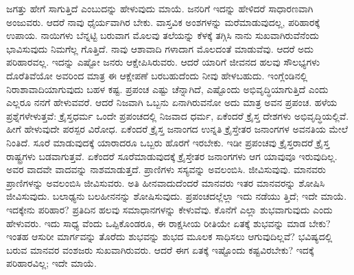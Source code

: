 ಜಗತ್ತು ಹೇಗೆ ಸಾಗುತ್ತಿದೆ ಎಂಬುದನ್ನು ಹೇಳುವುದು ಮಾಯೆ. ಜನರಿಗೆ ಇದನ್ನು ಹೇಳಿದರೆ ಸಾಧಾರಣವಾಗಿ ಅಂಜುವರು. ಆದರೆ ನಾವು ಧೈರ್ಯವಾಗಿರ ಬೇಕು. ವಾಸ್ತವಿಕ ಅಂಶಗಳನ್ನು ಮರೆಮಾಡುವುದಲ್ಲ, ಪರಿಹಾರಕ್ಕೆ ಉಪಾಯ. ನಾಯಿಗಳು ಬೆನ್ನಟ್ಟಿ ಬರುವಾಗ ಮೊಲವು ತಲೆಯನ್ನು ಕೆಳಕ್ಕೆ ತಗ್ಗಿಸಿ ನಾನು ಸುಖವಾಗಿರುವೆನೆಂದು ಭಾವಿಸುವುದು ನಿಮಗೆಲ್ಲ ಗೊತ್ತಿದೆ. ನಾವು ಆಶಾವಾದಿ ಗಳಾದಾಗ ಮೊಲದಂತೆ ಮಾಡುವೆವು. ಆದರೆ ಅದು ಪರಿಹಾರವಲ್ಲ. ಇದನ್ನು ಎಷ್ಟೋ ಜನರು ಆಕ್ಷೇಪಿಸಿರುವರು. ಆದರೆ ಯಾರಿಗೆ ಜೀವನದ ಹಲವು ಸೌಲಭ್ಯಗಳು ದೊರೆತಿವೆಯೋ ಅವರಿಂದ ಮಾತ್ರ ಈ ಆಕ್ಷೇಪಣೆ ಬರಬಹುದೆಂದು ನೀವು ಹೇಳಬಹುದು. ಇಂಗ್ಲೆಂಡಿನಲ್ಲಿ ನಿರಾಶಾವಾದಿಯಾಗುವುದು ಬಹಳ ಕಷ್ಟ. ಪ್ರಪಂಚ ಎಷ್ಟು ಚೆನ್ನಾಗಿದೆ, ಎಷ್ಟೊಂದು ಅಭಿವೃದ್ಧಿಯಾಗುತ್ತಿದೆ ಎಂದು ಎಲ್ಲರೂ ನನಗೆ ಹೇಳುವವರೆ. ಆದರೆ ನಿಜವಾಗಿ ಒಬ್ಬನು ಏನಾಗಿರುವನೋ ಅದು ಮಾತ್ರ ಅವನ ಪ್ರಪಂಚ. ಹಳೆಯ ಪ್ರಶ್ನೆಗಳೇಳುತ್ತವೆ: ಕ್ರೈಸ್ತಧರ್ಮ ಒಂದೇ ಪ್ರಪಂಚದಲ್ಲಿ ನಿಜವಾದ ಧರ್ಮ, ಏಕೆಂದರೆ ಕ್ರೈಸ್ತ ದೇಶಗಳು ಅಭಿವೃದ್ಧಿಯಲ್ಲಿವೆ. ಹೀಗೆ ಹೇಳುವುದೇ ಪರಸ್ಪರ ವಿರೋಧ. ಏಕೆಂದರೆ ಕ್ರೈಸ್ತ ಜನಾಂಗದ ಉನ್ನತಿ ಕ್ರೈಸ್ತೇತರ ಜನಾಂಗಗಳ ಅವನತಿಯ ಮೇಲೆ ನಿಂತಿದೆ. ಸೂರೆ ಮಾಡುವುದಕ್ಕೆ ಯಾರಾದರೂ ಒಬ್ಬರು ಹೊರಗೆ ಇರಬೇಕು. ಇಡೀ ಪ್ರಪಂಚವು ಕ್ರೈಸ್ತರಾದರೆ ಕ್ರೈಸ್ತ ರಾಷ್ಟ್ರಗಳು ಬಡವಾಗುತ್ತವೆ. ಏಕೆಂದರೆ ಸೂರೆಮಾಡುವುದಕ್ಕೆ ಕ್ರೈಸ್ತೇತರ ಜನಾಂಗಗಳು ಆಗ ಯಾವುವೂ ಇರುವುದಿಲ್ಲ. ಅವರ ವಾದವೇ ವಾದವನ್ನು ನಾಶಮಾಡುತ್ತದೆ. ಪ್ರಾಣಿಗಳು ಸಸ್ಯವನ್ನು ಅವಲಂಬಿಸಿ. ಜೀವಿಸುವುವು. ಮಾನವರು ಪ್ರಾಣಿಗಳನ್ನು ಅವಲಂಬಿಸಿ ಜೀವಿಸುವರು. ಅತಿ ಹೀನವಾದುದೆಂದರೆ ಮಾನವರು ಇತರ ಮಾನವರನ್ನು ಶೋಷಿಸಿ ಜೀವಿಸುವುದು. ಬಲಾಢ್ಯನು ಬಲಹೀನನನ್ನು ಶೋಷಿಸುವುದು. ಪ್ರಪಂಚದಲ್ಲೆಲ್ಲಾ ಇದು ನಡೆಯು ತ್ತಿದೆ; ಇದೇ ಮಾಯೆ. ಇದಕ್ಕೇನು ಪರಿಹಾರ? ಪ್ರತಿದಿನ ಹಲವು ಸಮಾಧಾನಗಳನ್ನು ಕೇಳುವೆವು. ಕೊನೆಗೆ ಎಲ್ಲಾ ಶುಭವಾಗುವುದು ಎಂದು ಹೇಳುವರು. ಇದು ಸಾಧ್ಯ ವೆಂದು ಒಪ್ಪಿಕೊಂಡರೂ, ಈ ರಾಕ್ಷಸೀಯ ರೀತಿಯೇ ಏತಕ್ಕೆ ಶುಭವನ್ನು ಮಾಡ ಬೇಕು? ಇಂತಹ ಆಸುರೀ ಮಾರ್ಗವನ್ನು ತೊರೆದು ಶುಭವನ್ನು ಶುಭದ ಮೂಲಕ ಸಾಧಿಸಲು ಆಗುವುದಿಲ್ಲವೆ? ಭವಿಷ್ಯದಲ್ಲಿ ಬರುವ ಮಾನವರ ವಂಶಜರು ಸುಖವಾಗಿರುವರು. ಆದರೆ ಈಗ ಏತಕ್ಕೆ ಇಷ್ಟೊಂದು ಕಷ್ಟವಿರಬೇಕು? ಇದಕ್ಕೆ ಪರಿಹಾರವಿಲ್ಲ; ಇದೇ ಮಾಯೆ.

